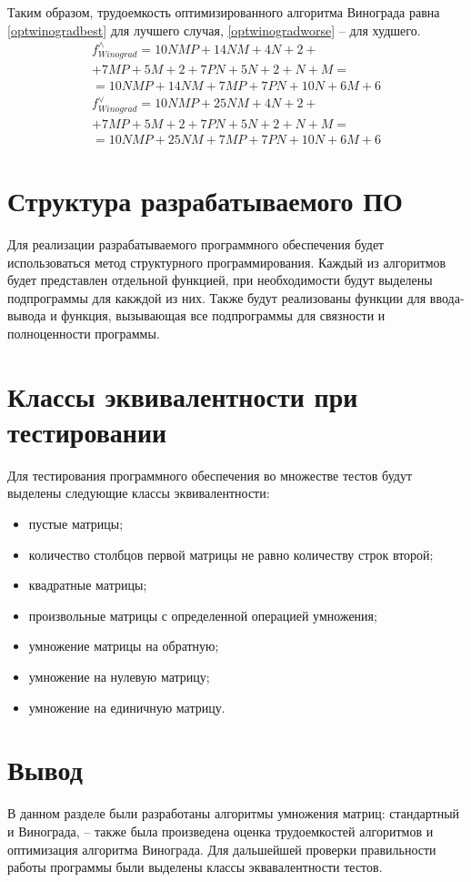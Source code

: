 Таким образом, трудоемкость оптимизированного алгоритма Винограда равна
\ref{optwinogradbest} для лучшего случая, \ref{optwinogradworse} -- для
худшего.
    \begin{multline}\label{optwinogradbest}
        f_{Winograd}^{\wedge} = 10NMP + 14NM + 4N + 2 + \\
                                + 7MP + 5M + 2
                                + 7PN + 5N + 2 + N + M = \\
                                = 10NMP + 14NM + 7MP
                                + 7PN + 10N + 6M + 6
    \end{multline}
    \begin{multline}\label{optwinogradworse}
        f_{Winograd}^{\vee} = 10NMP + 25NM + 4N + 2 + \\
                              + 7MP + 5M + 2
                              + 7PN + 5N + 2 + N + M = \\
                              = 10NMP + 25NM + 7MP
                              + 7PN + 10N + 6M + 6
    \end{multline}

\section{Структура разрабатываемого ПО}

Для реализации разрабатываемого программного обеспечения будет использоваться
метод структурного программирования. Каждый из алгоритмов будет представлен
отдельной функцией, при необходимости будут выделены подпрограммы для какждой
из них. Также будут реализованы функции для ввода-вывода
и функция, вызывающая все подпрограммы для связности и полноценности
программы.

\section{Классы эквивалентности при тестировании}

Для тестирования программного обеспечения во множестве тестов будут выделены
следующие классы эквивалентности:
\begin{itemize}[left=\parindent]
    \item пустые матрицы;
    \item количество столбцов первой матрицы не равно количеству строк второй;
    \item квадратные матрицы;
    \item произвольные матрицы с определенной операцией умножения;
    \item умножение матрицы на обратную;
    \item умножение на нулевую матрицу;
    \item умножение на единичную матрицу.
\end{itemize}

\section{Вывод}

В данном разделе были разработаны алгоритмы умножения матриц: стандартный и Винограда, -- также была произведена оценка трудоемкостей алгоритмов и оптимизация алгоритма Винограда. Для дальшейшей проверки правильности работы программы были выделены классы эквавалентности тестов.
